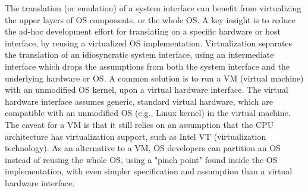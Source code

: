 The translation (or emulation) of a system interface
can benefit from virtualizing the upper layers of OS components,
or the whole OS. 
A key insight is to reduce the ad-hoc development effort for translating on a specific hardware or host interface, by reusing a virtualized OS implementation.
Virtualization separates the translation of an idiosyncratic system interface,
using an intermediate interface which drops the assumptions
from both the system interface and the underlying hardware or OS.
A common solution is to run a VM (virtual machine) with an unmodified OS kernel, upon a virtual hardware interface.
The virtual hardware interface 
assumes generic, standard virtual hardware, %
which are compatible with an unmodified OS (e.g., Linux kernel) in the virtual machine.
The caveat for a VM
is that it still relies on an assumption
that the CPU architecture has virtualization support,
such as Intel VT (virtualization technology).
As an alternative to a VM, OS developers can partition an OS instead of reusing the whole OS,
using a "pinch point" found inside the OS implementation,
with even simpler specification and assumption than a virtual hardware interface.





